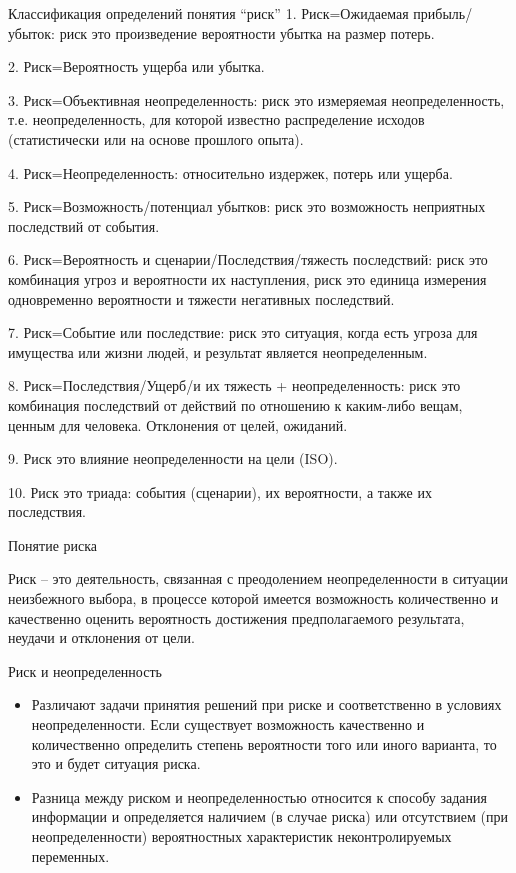 \documentclass[financial_risks_lectures.tex]{subfiles}
\begin{document}
\begin{frame}[allowframebreaks]{Классификация определений понятия ``риск''}
1. Риск=Ожидаемая прибыль/убыток: риск это произведение вероятности убытка на размер потерь.

2. Риск=Вероятность ущерба или убытка.

3. Риск=Объективная неопределенность: риск это измеряемая неопределенность, т.е. неопределенность, для которой известно распределение исходов (статистически или на основе прошлого опыта).

4. Риск=Неопределенность: относительно издержек, потерь или ущерба.

5. Риск=Возможность/потенциал убытков: риск это возможность неприятных последствий от события.

\pagebreak

6. Риск=Вероятность и сценарии/Последствия/тяжесть последствий: риск это комбинация угроз и вероятности их наступления, риск это единица измерения одновременно вероятности и тяжести негативных последствий.

7. Риск=Событие или последствие: риск это ситуация, когда есть угроза для имущества или жизни людей, и результат является неопределенным.

\pagebreak

8. Риск=Последствия/Ущерб/и их тяжесть + неопределенность: риск это комбинация последствий от действий по отношению к каким-либо вещам, ценным для человека. Отклонения от целей, ожиданий.

9. Риск это влияние неопределенности на цели (ISO).

10. Риск это триада: события (сценарии), их вероятности, а также их последствия.

\end{frame}
\begin{frame}{Понятие риска}
\begin{block}{Риск}
\quad – это деятельность, связанная с преодолением неопределенности в ситуации неизбежного выбора, в процессе которой имеется возможность количественно и качественно оценить вероятность достижения предполагаемого результата, неудачи и отклонения от цели.
\end{block}
\end{frame}
\begin{frame}{Риск и неопределенность}
  \begin{itemize}
  \item
Различают задачи принятия решений при риске и соответственно в условиях неопределенности. Если существует возможность качественно и количественно определить степень вероятности того или иного варианта, то это и будет ситуация риска.
  \item
Разница между риском и неопределенностью относится к способу задания информации и определяется наличием (в случае риска) или отсутствием (при неопределенности) вероятностных характеристик неконтролируемых переменных. 
  \end{itemize}
\end{frame}
\end{document}
